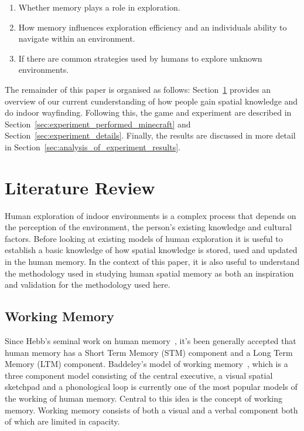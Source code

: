 \begin{enumerate}
\item Whether memory plays a role in exploration.
\item How memory influences exploration efficiency and an individuals ability to navigate within an environment.
\item If there are common strategies used by humans to explore unknown environments.
\end{enumerate}

The remainder of this paper is organised as follows: Section~\ref{sec:literature_review} provides an overview of our current cunderstanding of how people gain spatial knowledge and do indoor wayfinding. Following this, the game and experiment are described in Section~\ref{sec:experiment_performed_minecraft} and Section~\ref{sec:experiment_details}. Finally, the results are discussed in more detail in Section~\ref{sec:analysis_of_experiment_results}.

\section{Literature Review} %
\label{sec:literature_review}

Human exploration of indoor environments is a complex process that depends on the perception of the environment, the person's existing knowledge and cultural factors. Before looking at existing models of human exploration it is useful to establish a basic knowledge of how spatial knowledge is stored, used and updated in the human memory. In the context of this paper, it is also useful to understand the methodology used in studying human spatial memory as both an inspiration and validation for the methodology used here.
\subsection{Working Memory} %
\label{sec:spatial_information_in_human_working_memory}


Since Hebb's seminal work on human memory~\cite{DOH1949}, it's been generally accepted that human memory has a Short Term Memory (STM) component and a Long Term Memory (LTM) component. Baddeley's model of working memory~\cite{BaddeleyHitch74}, which is a three component model consisting of the central executive, a visual spatial sketchpad and a phonological loop is currently one of the most popular models of the working of human memory. Central to this idea is the concept of working memory. Working memory consists of both a visual and a verbal component both of which are limited in capacity.


